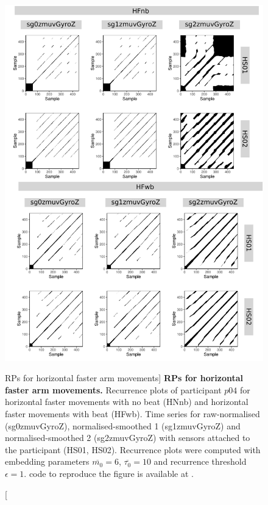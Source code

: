\begin{figure}
\centering
\includegraphics[height=0.8\textheight]{rps_HF_w500_p04}
\caption
	[RPs for horizontal faster arm movements]{
	{\bf RPs for horizontal faster arm movements.}	
	Recurrence plots of participant $p04$ for 
	horizontal faster movements with no beat (HNnb) and
	horizontal faster movements with beat (HFwb).
	Time series for raw-normalised (sg0zmuvGyroZ), 
	normalised-smoothed 1 (sg1zmuvGyroZ) and 
	normalised-smoothed 2 (sg2zmuvGyroZ) with
	sensors attached to the participant (HS01, HS02).
	Recurrence plots were computed with 
	embedding parameters $\overline{m_0}=6$, $\overline{\tau_0}=10$ and
	recurrence threshold $\epsilon=1$.
		\R code to reproduce the figure is available at 
		.
        }
    \label{fig:rps_HF_w500_p04}
\end{figure}




